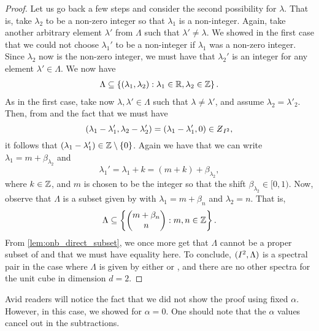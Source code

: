 \documentclass[../thesis.tex]{subfiles}
\begin{document}
\begin{proof}
    Let us go back a few steps and consider the second possibility for $\lambda$. That is, take $\lambda_2$ to be a non-zero integer so that $\lambda_1$ is a non-integer. Again, take another arbitrary element $\lambda'$ from $\Lambda$ such that $\lambda'\neq \lambda$. We showed in the first case that we could not choose $\lambda_1'$ to be a non-integer if $\lambda_1$ was a non-zero integer. Since $\lambda_2$ now is the non-zero integer, we must have that $\lambda_2'$ is an integer for any element $\lambda'\in \Lambda$. We now have
    \begin{align*}
        \Lambda \subseteq \left\{ \left(\lambda_1, \lambda_2\right) : \lambda_1 \in \mathbb{R}, \lambda_2 \in \mathbb{Z}\right\}.
    \end{align*}
    As in the first case, take now $\lambda, \lambda' \in \Lambda$ such that $\lambda\neq \lambda'$, and assume $\lambda_2 = \lambda'_2$. Then, from  and the fact that we must have 
    \begin{equation*}
        \brac{\lambda_1-\lambda'_1,\lambda_2-\lambda'_2} = \brac{\lambda_1-\lambda'_1,0}\in \Zstroke_{I^2},
    \end{equation*}
    it follows that $(\lambda_1- \lambda_1') \in \mathbb{Z}\setminus\{0\}$. Again we have that we can write $\lambda_1  = m+\beta_{\lambda_2}$ and 
    \begin{equation*}
        \lambda_1'  = \lambda_1 + k = (m+k) + \beta_{\lambda_2},
    \end{equation*}
    where $k \in \mathbb{Z}$, and $m$ is chosen to be the integer so that the shift $\beta_{\lambda_2} \in [0,1)$. Now, observe that $\Lambda$ is a subset given by  with $\lambda_1 = m + \beta_n$ and $\lambda_2 = n$. That is,
    \begin{equation*}  %
        \Lambda \subseteq \braqMed{\begin{pmatrix} m +\beta_n \\ n\end{pmatrix} : m,n \in \Z}.
    \end{equation*} %
    From \cref{lem:onb_direct_subset}, we once more get that $\Lambda$ cannot be a proper subset of  and that we must have equality here. To conclude, $(I^2, \Lambda)$ is a spectral pair in the case where $\Lambda$ is given by either  or , and there are no other spectra for the unit cube in dimension $d=2$.
\end{proof}

\begin{remark}
    Avid readers will notice the fact that we did not show the proof using fixed $\alpha$. However, in this case, we showed for $\alpha =0$. One should note that the $\alpha$ values cancel out in the subtractions. 
\end{remark}
\end{document}
